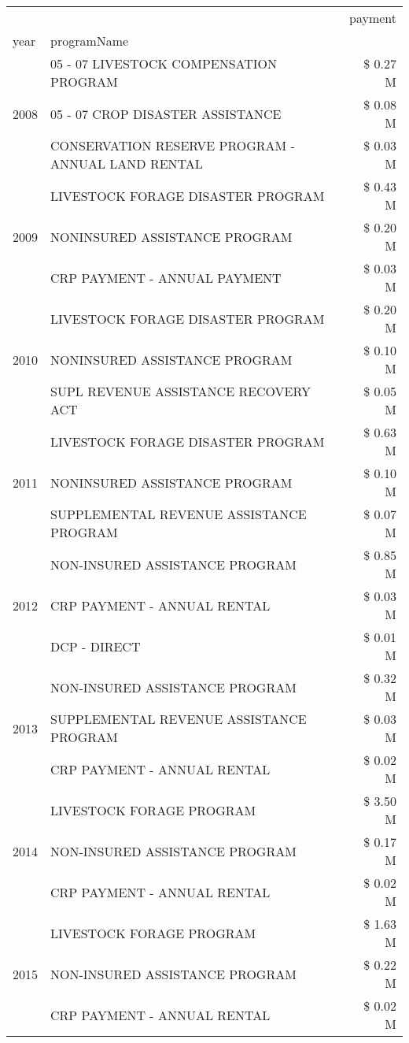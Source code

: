 \begin{tabular}{llr}
\toprule
 &  & payment \\
year & programName &  \\
\midrule
\multirow[t]{3}{*}{2008} & 05 - 07 LIVESTOCK COMPENSATION PROGRAM & \$ 0.27 M \\
 & 05 - 07 CROP DISASTER ASSISTANCE & \$ 0.08 M \\
 & CONSERVATION RESERVE PROGRAM - ANNUAL LAND RENTAL & \$ 0.03 M \\
\cline{1-3}
\multirow[t]{3}{*}{2009} & LIVESTOCK FORAGE DISASTER  PROGRAM & \$ 0.43 M \\
 & NONINSURED ASSISTANCE PROGRAM & \$ 0.20 M \\
 & CRP PAYMENT - ANNUAL PAYMENT & \$ 0.03 M \\
\cline{1-3}
\multirow[t]{3}{*}{2010} & LIVESTOCK FORAGE DISASTER  PROGRAM & \$ 0.20 M \\
 & NONINSURED ASSISTANCE PROGRAM & \$ 0.10 M \\
 & SUPL REVENUE ASSISTANCE RECOVERY ACT & \$ 0.05 M \\
\cline{1-3}
\multirow[t]{3}{*}{2011} & LIVESTOCK FORAGE DISASTER PROGRAM & \$ 0.63 M \\
 & NONINSURED ASSISTANCE PROGRAM & \$ 0.10 M \\
 & SUPPLEMENTAL REVENUE ASSISTANCE PROGRAM & \$ 0.07 M \\
\cline{1-3}
\multirow[t]{3}{*}{2012} & NON-INSURED ASSISTANCE PROGRAM & \$ 0.85 M \\
 & CRP PAYMENT - ANNUAL RENTAL & \$ 0.03 M \\
 & DCP - DIRECT & \$ 0.01 M \\
\cline{1-3}
\multirow[t]{3}{*}{2013} & NON-INSURED ASSISTANCE PROGRAM & \$ 0.32 M \\
 & SUPPLEMENTAL REVENUE ASSISTANCE PROGRAM & \$ 0.03 M \\
 & CRP PAYMENT - ANNUAL RENTAL & \$ 0.02 M \\
\cline{1-3}
\multirow[t]{3}{*}{2014} & LIVESTOCK FORAGE PROGRAM & \$ 3.50 M \\
 & NON-INSURED ASSISTANCE PROGRAM & \$ 0.17 M \\
 & CRP PAYMENT - ANNUAL RENTAL & \$ 0.02 M \\
\cline{1-3}
\multirow[t]{3}{*}{2015} & LIVESTOCK FORAGE PROGRAM & \$ 1.63 M \\
 & NON-INSURED ASSISTANCE PROGRAM & \$ 0.22 M \\
 & CRP PAYMENT - ANNUAL RENTAL & \$ 0.02 M \\

\end{tabular}
